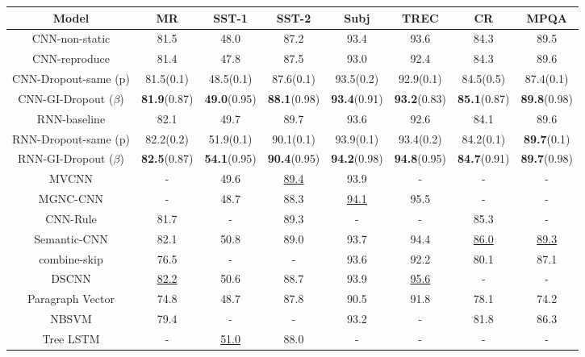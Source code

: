 \begin{table}[t]
\begin{small}
\tabcolsep=0.11cm

\centering
\begin{tabular}{c |ccccccc}
\hline
\bfseries Model             & MR   & SST-1 & SST-2 & Subj & TREC &  CR  & MPQA\\
\hline
CNN-non-static & 81.5 & 48.0  & 87.2  & 93.4 & 93.6 & 84.3 & 89.5\\
\hline
CNN-reproduce       & 81.4 & 47.8  & 87.5  & 93.0 & 92.4 & 84.3 & 89.6\\
CNN-Dropout-same (p)       &  81.5(0.1) & 48.5(0.1)  & 87.6(0.1)  & 93.5(0.2) & 92.9(0.1)& 84.5(0.5) & 87.4(0.1)\\

CNN-GI-Dropout ($\beta$) & \textbf{81.9}(0.87) & \textbf{49.0}(0.95)  & \textbf{88.1}(0.98)  & \textbf{93.4}(0.91) & \textbf{93.2}(0.83) & \textbf{85.1}(0.87) & \textbf{89.8}(0.98)\\

\hline
\hline
RNN-baseline & 82.1 & 49.7  & 89.7  & 93.6 & 92.6 & 84.1 & 89.6\\
RNN-Dropout-same (p) & 82.2(0.2) & 51.9(0.1)  & 90.1(0.1)  & 93.9(0.1) & 93.4(0.2) & 84.2(0.1) & \textbf{89.7}(0.1)\\
RNN-GI-Dropout ($\beta$) & \textbf{82.5}(0.87) & \textbf{54.1}(0.95)  & \textbf{90.4}(0.95)  & \textbf{94.2}(0.98) & \textbf{94.8}(0.95) & \textbf{84.7}(0.91) & \textbf{89.7}(0.98)\\

\hline
\hline
MVCNN & - & 49.6 & \underline{89.4} & 93.9 & - & - & -\\ 
MGNC-CNN & - & 48.7 & 88.3 & \underline{94.1} & 95.5 & - & -\\ 
CNN-Rule & 81.7 & - & 89.3 & - & - & 85.3 & -\\ 
Semantic-CNN & 82.1 & 50.8 & 89.0 & 93.7 & 94.4 & \underline{86.0} & \underline{89.3}\\ 
combine-skip & 76.5 & - & - & 93.6 & 92.2 & 80.1 & 87.1\\ 
DSCNN & \underline{82.2} & 50.6 & 88.7 & 93.9 & \underline{95.6} & - & -\\ 
Paragraph Vector & 74.8 & 48.7 & 87.8 & 90.5 & 91.8 & 78.1 & 74.2\\ 
NBSVM & 79.4 & - & - & 93.2 & - & 81.8 & 86.3\\ 
Tree LSTM & - & \underline{51.0} & 88.0 & - & - & - & -\\ 
\hline
\end{tabular}


\end{small}
\end{table}
